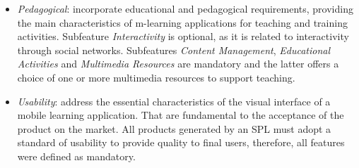 \begin{itemize}

    \item \textit{Pedagogical}: incorporate educational and pedagogical requirements, providing the main characteristics of m-learning applications for teaching and training activities. Subfeature \textit{Interactivity} is optional, as it is related to interactivity through social networks. Subfeatures \textit{Content Management}, \textit{Educational Activities} and \textit{Multimedia Resources} are mandatory and the latter offers a choice of one or more multimedia resources to support teaching.
    
    \item \textit{Usability}: address the essential characteristics of the visual interface of a mobile learning application. That are fundamental to the acceptance of the product on the market. All products generated by an SPL must adopt a standard of usability to provide quality to final users, therefore, all features were defined as mandatory.



\end{itemize}
